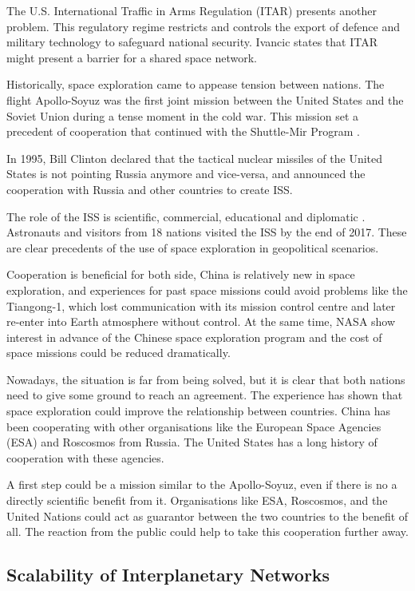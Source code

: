 The U.S. International Traffic in Arms Regulation (ITAR) presents another problem. This regulatory regime restricts and controls the export of defence and military technology to safeguard national security. Ivancic \cite{ivancic2009security} states that ITAR might present a barrier for a shared space network.

Historically, space exploration came to appease tension between nations. The flight Apollo-Soyuz was the first joint mission between the United States and the Soviet Union during a tense moment in the cold war.  This mission set a precedent of cooperation that continued with the Shuttle-Mir Program \cite{moltz2011politics}. 

In 1995, Bill Clinton declared that the tactical nuclear missiles of the United States is not pointing Russia anymore and vice-versa, and announced the cooperation with Russia and other countries to create ISS. 

The role of the ISS is scientific, commercial, educational and diplomatic \cite{costantini2014international}. Astronauts and visitors from 18 nations visited the ISS by the end of 2017. These are clear precedents of the use of space exploration in geopolitical scenarios. 


Cooperation is beneficial for both side, China is relatively new in space exploration, and experiences for past space missions could avoid problems like the Tiangong-1, which lost communication with its mission control centre and later re-enter into Earth atmosphere without control. At the same time, NASA show interest in advance of the Chinese space exploration program and the cost of space missions could be reduced dramatically. 

Nowadays, the situation is far from being solved, but it is clear that both nations need to give some ground to reach an agreement. The experience has shown that space exploration could improve the relationship between countries. China has been cooperating with other organisations like the European Space Agencies (ESA) and Roscosmos from Russia. The United States has a long history of cooperation with these agencies. 

A first step could be a mission similar to the Apollo-Soyuz, even if there is no a directly scientific benefit from it. Organisations like ESA, Roscosmos, and the United Nations could act as guarantor between the two countries to the benefit of all. The reaction from the public could help to take this cooperation further away.

\subsection{Scalability of Interplanetary Networks}

